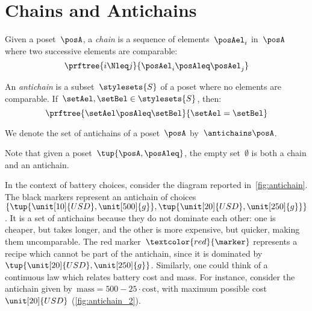 

\section{Chains and Antichains}
\label{sec:chains-antichains}

\begin{definition}
  \label{def:chain}
  Given a poset~$\posA$, a \emph{chain} is a sequence of elements~${\posAel_i}$ in~$\posA$ where two successive elements are comparable:
  \begin{equation}
    \prftree{i \Nleq j }{\posAel_i \posAleq \posAel_j}
  \end{equation}
\end{definition}


\begin{definition}
  \label{def:antichain}
  An \emph{antichain} is a subset~$\stylesets{S}$ of a poset where no elements are comparable.
  If~$\setAel,\setBel \in \stylesets{S}$, then:
  \begin{equation}
    \prftree{\setAel \posAleq \setBel}{\setAel=\setBel}
\end{equation}
\end{definition}

We denote the set of antichains of a poset~$\posA$ by~$\antichains\posA$.

\begin{remark}
  Note that given a poset~$\tup{\posA,\posAleq}$, the empty set~$\emptyset$ is both a chain and an antichain.
\end{remark}

In the context of battery choices, consider the diagram reported in~\cref{fig:antichain}.
The black markers represent an antichain of choices~$\{\tup{\unit[10]{USD},\unit[500]{g}},\tup{\unit[20]{USD},\unit[250]{g}}\}$.
It is a set of antichains because they do not dominate each other: one is cheaper, but takes longer, and the other is more expensive, but quicker, making them uncomparable.
The red marker~$\textcolor{red}{\marker}$ represents a recipe which cannot be part of the antichain, since it is dominated by~$\tup{\unit[20]{USD},\unit[250]{g}}$.
Similarly, one could think of a continuous law which relates battery cost and mass.
For instance, consider the antichain given by~$\text{mass}=500-25\cdot \text{cost}$, with maximum possible cost~$\unit[20]{USD}$ (\cref{fig:antichain_2}).

